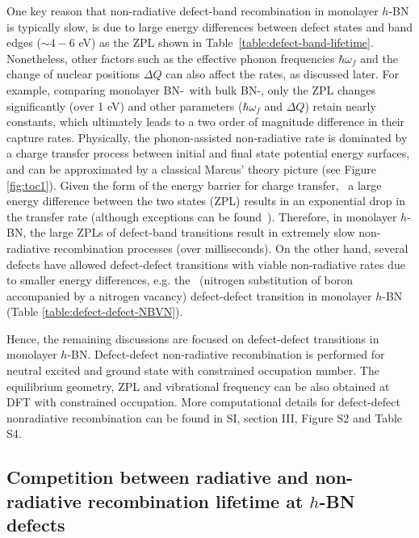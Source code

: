 One key reason that non-radiative defect-band recombination in monolayer $h$-BN is typically slow, is due to large energy differences between defect states and band edges ($\sim4-6$ eV) as the ZPL shown in Table~\ref{table:defect-band-lifetime}.~\cite{wu2017first,smart2018fundamental,rasmussen2016efficient} Nonetheless, other factors such as the effective phonon frequencies $\hbar\omega_f$ and the change of nuclear positions $\Delta Q$ can also affect the rates, as discussed later.
For example, comparing monolayer BN-\CN\ with bulk BN-\CN, only the ZPL changes significantly (over 1 eV) and other parameters ($\hbar\omega_f$ and $\Delta Q$) retain nearly constants, which ultimately leads to a two order of magnitude difference in their capture rates.
Physically, the phonon-assisted non-radiative rate is dominated by a charge transfer process between initial and final state potential energy surfaces, and can be approximated by a classical Marcus' theory picture (see Figure \ref{fig:toc1}). Given the form of the energy barrier for charge transfer,~\cite{brawand2015surface} a large energy difference between the two states (ZPL) results in an exponential drop in the transfer rate (although exceptions can be found~\cite{nan2009nuclear,jortner1976temperature,passler1982nonradiative,shi2015comparative}). Therefore, in monolayer $h$-BN, the large ZPLs of defect-band transitions result in extremely slow non-radiative recombination processes (over milliseconds).
On the other hand, several defects have allowed defect-defect transitions with viable non-radiative rates due to smaller energy differences, e.g. the \NBVN\ (nitrogen substitution of boron accompanied by a nitrogen vacancy) defect-defect transition in monolayer $h$-BN (Table \ref{table:defect-defect-NBVN}).

Hence, the remaining discussions are focused on defect-defect transitions in monolayer $h$-BN. Defect-defect non-radiative recombination is performed for neutral excited and ground state with constrained occupation number. The equilibrium geometry, ZPL and vibrational frequency can be also obtained at DFT with constrained occupation. More computational details for defect-defect nonradiative recombination can be found in SI, section III, Figure S2 and Table S4. %

\subsection{Competition between radiative and non-radiative recombination lifetime at $h$-BN defects}

